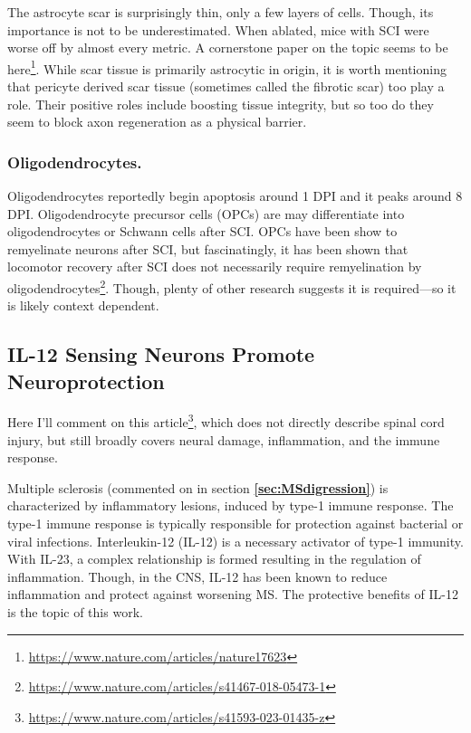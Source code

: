 \documentclass[12pt]{report}
\begin{document}
The astrocyte scar is surprisingly thin, only a few layers of cells. Though, its importance is not to be underestimated. When ablated, mice with SCI were worse off by almost every metric. A cornerstone paper on the topic seems to be here\footnote{\url{https://www.nature.com/articles/nature17623}}. While scar tissue is primarily astrocytic in origin, it is worth mentioning that pericyte derived scar tissue (sometimes called the fibrotic scar) too play a role. Their positive roles include boosting tissue integrity, but so too do they seem to block axon regeneration as a physical barrier. 

\subsubsection{Oligodendrocytes.}
Oligodendrocytes reportedly begin apoptosis around 1 DPI and it peaks around 8 DPI. Oligodendrocyte precursor cells (OPCs) are may differentiate into oligodendrocytes or Schwann cells after SCI. OPCs have been show to remyelinate neurons after SCI, but fascinatingly, it has been shown that locomotor recovery after SCI does not necessarily require remyelination by oligodendrocytes\footnote{\url{https://www.nature.com/articles/s41467-018-05473-1}}. Though, plenty of other research suggests it is required---so it is likely context dependent. 

\subsection{IL-12 Sensing Neurons Promote Neuroprotection}

Here I'll comment on this article\footnote{\url{https://www.nature.com/articles/s41593-023-01435-z}}, which does not directly describe spinal cord injury, but still broadly covers neural damage, inflammation, and the immune response.\newline

Multiple sclerosis (commented on in section \textbf{\ref{sec:MSdigression}}) is characterized by inflammatory lesions, induced by type-1 immune response. The type-1 immune response is typically responsible for protection against bacterial or viral infections. 
Interleukin-12 (IL-12) is a necessary activator of type-1 immunity. With IL-23, a complex relationship is formed resulting in the regulation of inflammation. Though, in the CNS, IL-12 has been known to reduce inflammation and protect against worsening MS. The protective benefits of IL-12 is the topic of this work.\newline
\end{document}
